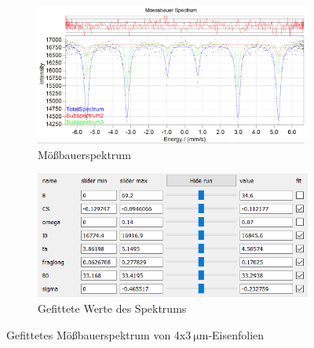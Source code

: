 \documentclass[german, %
parskip=full, %
bibliography=totoc, %
]{scrartcl}
\begin{document}
\begin{figure}[ht]
	\centering
	\begin{subfigure}[b]{0.5\textwidth}
		\includegraphics[width=\textwidth]{MoessbauerEisen4x3}
	  \caption{Mößbauerspektrum}
	  \label{fig:moess4x3}
  \end{subfigure}
  \begin{subfigure}[b]{0.4\textwidth}
	  \includegraphics[width=\textwidth]{WerteEisen4x3}
	  \caption{Gefittete Werte des Spektrums}
	  \label{fig:werte4x3}
  \end{subfigure}
	\caption{Gefittetes Mößbauerspektrum von 4x\(\SI{3}{\micro\meter}\)-Eisenfolien}
	\label{fig:eisen4x3}
\end{figure}
\end{document}
